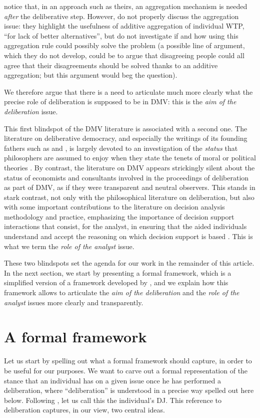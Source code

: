 \documentclass[version=3.21, pagesize, twoside=off, bibliography=totoc, DIV=calc, fontsize=12pt, a4paper, french, english]{scrartcl}
\begin{document}
\citeauthor{bartkowski_beyond_2018} notice that, in an approach such as theirs, an aggregation mechanism is needed \emph{after} the deliberative step.
However, \citeauthor{bartkowski_beyond_2018} do not properly discuss the aggregation issue: they highlight the usefulness of additive aggregation of individual WTP, ``for lack of better alternatives'', but do not investigate if and how using this aggregation rule could possibly solve the problem (a possible line of argument, which they do not develop, could be to argue that disagreeing people could all agree that their disagreements should be solved thanks to an additive aggregation; but this argument would beg the question).

We therefore argue that there is a need to articulate much more clearly what the precise role of deliberation is supposed to be in DMV: this is the \emph{aim of the deliberation} issue.

This first blindspot of the DMV literature is associated with a second one. The literature on deliberative democracy, and especially the writings of its founding fathers such as \citet{rawls_political_2005} and \citet{habermas_faktizitat_1992}, is largely devoted to an investigation of the \emph{status} that philosophers are assumed to enjoy when they state the tenets of moral or political theories \citep{meinard_du_2014}. 
By contrast, the literature on DMV appears strickingly silent about the status of economists and consultants involved in the proceedings of deliberation as part of DMV, as if they were transparent and neutral observers. 
This stands in stark contrast, not only with the philosophical literature on deliberation, but also with some important contributions to the literature on decision analysis methodology and practice, emphasizing the importance of decision support interactions that consist, for the analyst, in ensuring that the aided individuals understand and accept the reasoning on which decision support is based \citep{roy_multicriteria_1996}. 
This is what we term the \emph{role of the analyst} issue.

These two blindspots set the agenda for our work in the remainder of this article. 
In the next section, we start by presenting a formal framework, which is a simplified version of a framework developed by \citet{cailloux_formal_2018}, and we explain how this framework allows to articulate the \emph{aim of the deliberation} and the \emph{role of the analyst} issues more clearly and transparently.

\section{A formal framework}
Let us start by spelling out what a formal framework should capture, in order to be useful for our purposes. 
We want to carve out a formal representation of the stance that an individual has on a given issue once he has performed a deliberation, where “deliberation” is understood in a precise way spelled out here below. 
Following \citet{cailloux_formal_2018}, let us call this the individual's \ac{DJ}. 
This reference to deliberation captures, in our view, two central ideas.
\end{document}
